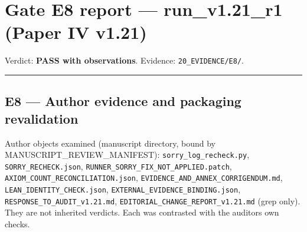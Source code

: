 \documentclass[
]{article}
\author{}
\date{}
\begin{document}
\section{Gate E8 report --- run\_v1.21\_r1 (Paper IV
v1.21)}\label{gate-e8-report--run_v121_r1-paper-iv-v121}

Verdict: \textbf{PASS with observations}. Evidence:
\texttt{20\_EVIDENCE/E8/}.

\begin{center}\rule{0.5\linewidth}{0.5pt}\end{center}

\subsection{E8 --- Author evidence and packaging
revalidation}\label{e8--author-evidence-and-packaging-revalidation}

Author objects examined (manuscript directory, bound by
MANUSCRIPT\_REVIEW\_MANIFEST): \texttt{sorry\_log\_recheck.py},
\texttt{SORRY\_RECHECK.json},
\texttt{RUNNER\_SORRY\_FIX\_NOT\_APPLIED.patch},
\texttt{AXIOM\_COUNT\_RECONCILIATION.json},
\texttt{EVIDENCE\_AND\_ANNEX\_CORRIGENDUM.md},
\texttt{LEAN\_IDENTITY\_CHECK.json},
\texttt{EXTERNAL\_EVIDENCE\_BINDING.json},
\texttt{RESPONSE\_TO\_AUDIT\_v1.21.md},
\texttt{EDITORIAL\_CHANGE\_REPORT\_v1.21.md} (grep only). They are not
inherited verdicts. Each was contrasted with the
auditor\textquotesingle s own checks.
\end{document}
